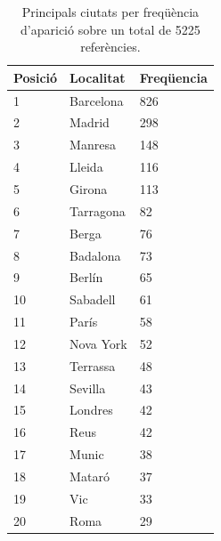 \documentclass[12pt,a4paper,openright,oneside]{article}
\numberwithin{equation}{section}
\theoremstyle{definition}
\begin{document}
\begin{table}[!htbp]
\begin{center}
	\centering
    \begin{tabular}{| l | l | l |}
    \hline
    \textbf{Posició} & \textbf{Localitat} & \textbf{Freqüencia} \\ \hline
    1 	&	Barcelona		 	& 826 \\ \hline
	2	&	Madrid 				& 298 \\ \hline
	3	&	Manresa 			& 148 \\ \hline
	4	&	Lleida				& 116 \\ \hline
	5	&	Girona				& 113 \\ \hline
	6	&	Tarragona			& 82 \\ \hline
	7	&	Berga				& 76 \\ \hline
	8	&	Badalona			& 73 \\ \hline
	9	&	Berlín				& 65 \\ \hline
	10	&	Sabadell			& 61 \\ \hline	
	11	&	París				& 58 \\ \hline
	12	&	Nova York			& 52 \\ \hline 
	13	&	Terrassa			& 48 \\ \hline
	14	&	Sevilla				& 43 \\ \hline
	15	&	Londres				& 42 \\ \hline
	16	&	Reus				& 42 \\ \hline
	17	&	Munic				& 38 \\ \hline
	18	&	Mataró				& 37 \\ \hline
	19	&	Vic					& 33 \\ \hline
	20	&	Roma				& 29 \\ \hline
    \end{tabular}
\end{center}
\caption{Principals ciutats per freqüència d'aparició sobre un total de 5225 referències.}
\end{table}
\end{document}
